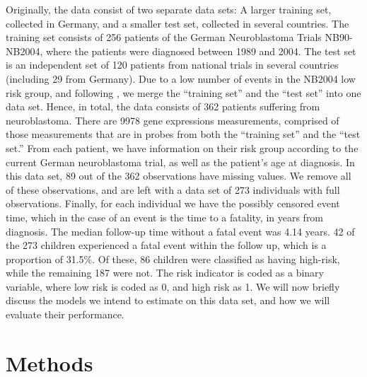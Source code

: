 Originally, the data consist of two separate data sets:
A larger training set, collected in Germany, and a smaller test set, collected in several countries.
The training set consists of 256 patients of the German Neuroblastoma Trials NB90-NB2004, where the patients were diagnosed between 1989 and 2004.
The test set is an independent set of 120 patients from national trials in several countries (including 29 from Germany).
Due to a low number of events in the NB2004 low risk group, and following \citet{bovelstad2009}, we merge the ``training set'' and the ``test set'' into one data set.
Hence, in total, the data consists of 362 patients suffering from neuroblastoma.
There are 9978 gene expressions measurements, comprised of those measurements that are in probes from both the ``training set'' and the ``test set.''
From each patient, we have information on their risk group according to the current German neuroblastoma trial, as well as the patient's age at diagnosis.
In this data set, 89 out of the 362 observations have missing values.
We remove all of these observations, and are left with a data set of 273 individuals with full observations.
Finally, for each individual we have the possibly censored event time, which in the case of an event is the time to a fatality, in years from diagnosis.
The median follow-up time without a fatal event was 4.14 years.
42 of the 273 children experienced a fatal event within the follow up, which is a proportion of 31.5\%.
Of these, 86 children were classified as having high-risk, while the remaining 187 were not.
The risk indicator is coded as a binary variable, where low risk is coded as 0, and high risk as 1.
We will now briefly discuss the models we intend to estimate on this data set, and how we will evaluate their performance.

\section{Methods}
